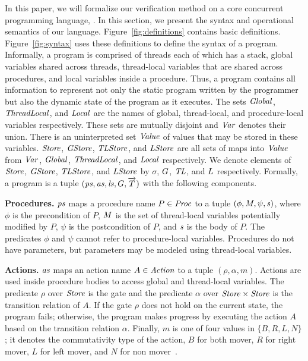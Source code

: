 In this paper, we will formalize our verification method on a core concurrent programming language, \civl.
In this section, we present the syntax and operational semantics of our language.
Figure~\ref{fig:definitions} contains basic definitions.
Figure~\ref{fig:syntax} uses these definitions to define the syntax of a \civl program.
Informally, a \civl program is comprised of threads each of which has a stack, global variables shared across threads, 
thread-local variables that are shared across procedures, and local variables inside a procedure.
Thus, a program contains all information to represent not only the static program 
written by the programmer but also the dynamic state of the program as it executes.
The sets $\mathit{Global}$, $\mathit{ThreadLocal}$, and $\mathit{Local}$ are the names of global, thread-local, and procedure-local variables 
respectively.
These sets are mutually disjoint and $\mathit{Var}$ denotes their union.
There is an uninterpreted set $\mathit{Value}$ of values that may be stored in these variables.
$\mathit{Store}$, $\mathit{GStore}$, $\mathit{TLStore}$, and $\mathit{LStore}$ are all sets of maps into $\mathit{Value}$
from $\mathit{Var}$, $\mathit{Global}$, $\mathit{ThreadLocal}$, and $\mathit{Local}$ respectively.
We denote elements of $\mathit{Store}$, $\mathit{GStore}$, $\mathit{TLStore}$, and $\mathit{LStore}$
by $\sigma$, $G$, $\mathit{TL}$, and $L$ respectively.
Formally, a \civl program is a tuple $(\mathit{ps}, \mathit{as}, \mathit{ls}, G, \overrightarrow{T})$ with the following components.

\noindent
{\bf Procedures.}
$\mathit{ps}$ maps a procedure name $P \in \mathit{Proc}$ to a tuple $(\phi, M, \psi, \mathit{s})$, 
where $\phi$ is the precondition of $P$, $M$ is the set of thread-local variables potentially modified by $P$, 
$\psi$ is the postcondition of $P$, and $\mathit{s}$ is the body of $P$.
The predicates $\phi$ and $\psi$ cannot refer to procedure-local variables.
Procedures do not have parameters, but parameters may be modeled using thread-local variables.

\noindent
{\bf Actions.}
$\mathit{as}$ maps an action name $A \in \mathit{Action}$ to a tuple $(\rho,\alpha,m)$.
Actions are used inside procedure bodies to access global and thread-local variables.
The predicate $\rho$ over $\mathit{Store}$ is the gate and the predicate $\alpha$ over $\mathit{Store} \times \mathit{Store}$ 
is the transition relation of $A$.
If the gate $\rho$ does not hold on the current state, the program fails;
otherwise, the program makes progress by executing the action $A$ based on the transition relation $\alpha$.
Finally, $m$ is one of four values in $\{B,R,L,N\}$;
it denotes the commutativity type of the action, $B$ for both mover, $R$ for right mover, $L$ for left mover, 
and $N$ for non mover~\cite{FlanaganFLQ08}. 

